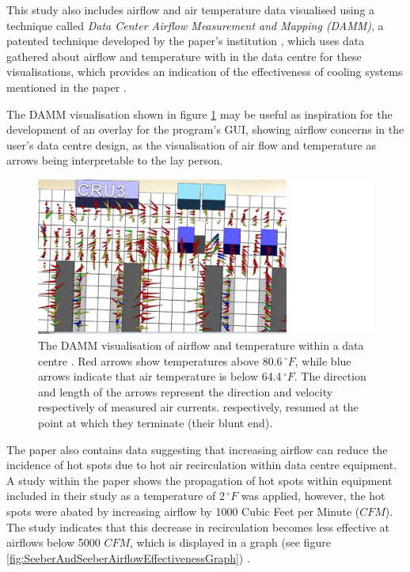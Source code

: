 This study also includes airflow and air temperature data visualised using a technique called \emph{Data Center Airflow Measurement and Mapping (DAMM)}, a patented technique developed by the paper's institution \cite{SeeberAndSeeberImprovingDataCenterEnergyEfficiencyThroughEnvironmentalOptimization}, which uses data gathered about airflow and temperature with in the \gls{data centre} for these visualisations, which provides an indication of the effectiveness of cooling systems mentioned in the paper \cite[Optimizing Air Temperature Set Points and Air Flows Can Shrink PUE Numbers]{SeeberAndSeeberImprovingDataCenterEnergyEfficiencyThroughEnvironmentalOptimization}.

The DAMM visualisation shown in figure \ref{fig:SeeberAndSeeberDAMM} may be useful as inspiration for the development of an overlay for the program's GUI, showing airflow concerns in the user's \gls{data centre} design, as the visualisation of air flow and temperature as arrows being interpretable to the lay person.


\begin{figure}[H]
\centering
\includegraphics[width=5in]{Resources//SeeberAndSeeberDAMMImage.png}
\caption{
The DAMM visualisation of airflow and temperature within a data centre \cite[Optimizing Air Temperature Set Points and Air Flows Can Shrink PUE Numbers]{SeeberAndSeeberImprovingDataCenterEnergyEfficiencyThroughEnvironmentalOptimization}. Red arrows show temperatures above 80.6$\,^{\circ}F$, while blue arrows indicate that air temperature is below 64.4$\,^{\circ}F$. The direction and length of the arrows represent the direction and velocity respectively of measured air currents. respectively, resumed at the point at which they terminate (their blunt end).}
\label{fig:SeeberAndSeeberDAMM}
\end{figure}

The paper also contains data suggesting that increasing airflow can reduce the incidence of hot spots due to hot air \gls{recirculation} within data centre equipment. A study within the paper shows the propagation of hot spots within equipment included in their study as a temperature of 2$\,^{\circ}F$ was applied, however, the hot spots were abated by increasing airflow by 1000 Cubic Feet per Minute ($CFM$).
The study indicates that this decrease in recirculation becomes less effective at airflows below 5000 $CFM$, which is displayed in a graph (see figure \ref{fig:SeeberAndSeeberAirflowEffectivenessGraph}) \cite[The Numbers: How Much Can You Really Save Through Environmental Optimization?]{SeeberAndSeeberImprovingDataCenterEnergyEfficiencyThroughEnvironmentalOptimization}.

